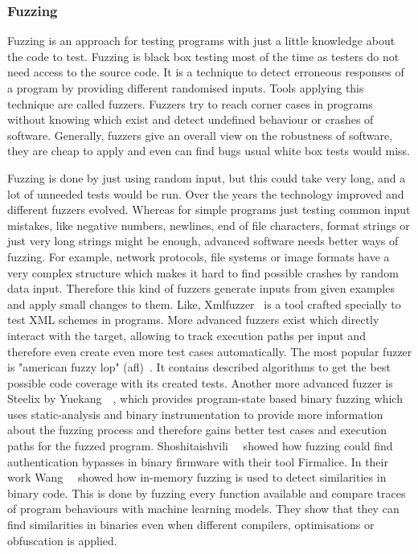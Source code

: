 \subsubsection{Fuzzing}

Fuzzing is an approach for testing programs with just a little knowledge about
the code to test. Fuzzing is black box testing most of the time as testers do
not need access to the source code. It is a technique to detect erroneous
responses of a program by providing different randomised inputs. Tools applying
this technique are called fuzzers. Fuzzers try to reach corner cases in programs
without knowing which exist and detect undefined behaviour or crashes of
software. Generally, fuzzers give an overall view on the robustness of software,
they are cheap to apply and even can find bugs usual white box tests would miss.

Fuzzing is done by just using random input, but this could take very long, and a
lot of unneeded tests would be run. Over the years the technology improved and
different fuzzers evolved. Whereas for simple programs just testing common input
mistakes, like negative numbers, newlines, end of file characters, format
strings or just very long strings might be enough, advanced software needs
better ways of fuzzing. For example, network protocols, file systems or image
formats have a very complex structure which makes it hard to find possible
crashes by random data input. Therefore this kind of fuzzers generate inputs
from given examples and apply small changes to them. Like, Xmlfuzzer~ is a tool crafted specially to test XML schemes in programs. More
advanced fuzzers exist which directly interact with the target, allowing to
track execution paths per input and therefore even create even more test cases
automatically. The most popular fuzzer is "american fuzzy lop" (afl)~. It contains described algorithms to get the best possible code coverage
with its created tests. Another more advanced fuzzer is Steelix by
Yuekang~\etal~\cite{steelix}, which provides program-state based binary fuzzing
which uses static-analysis and binary instrumentation to provide more
information about the fuzzing process and therefore gains better test cases and
execution paths for the fuzzed program. Shoshitaishvili~\etal~\cite{firmalice}
showed how fuzzing could find authentication bypasses in binary firmware with
their tool Firmalice. In their work Wang~\etal~\cite{inmemfuzzing} showed how
in-memory fuzzing is used to detect similarities in binary code. This is done by
fuzzing every function available and compare traces of program behaviours with
machine learning models. They show that they can find similarities in binaries
even when different compilers, optimisations or obfuscation is applied.

